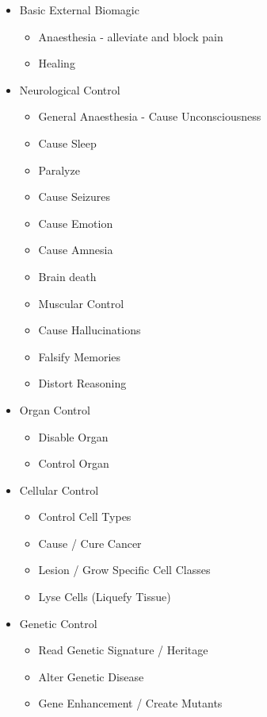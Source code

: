\documentclass[letterpaper,serif]{rpg-module}
\begin{document}
    \begin{itemize}
	\item Basic External Biomagic
	\begin{itemize}
    	\item Anaesthesia - alleviate and block pain
	    \item Healing
	\end{itemize}
	\item Neurological Control
	\begin{itemize}
    	\item General Anaesthesia - Cause Unconsciousness
	    \item Cause Sleep
	    \item Paralyze
	    \item Cause Seizures
	    \item Cause Emotion 
	    \item Cause Amnesia
	    \item Brain death
	    \item Muscular Control
	    \item Cause Hallucinations
	    \item Falsify Memories
	    \item Distort Reasoning
	\end{itemize}
	\item Organ Control
	\begin{itemize}
	    \item Disable Organ
	    \item Control Organ
	\end{itemize}
	\item Cellular Control 
	\begin{itemize}
	    \item Control Cell Types 
	    \item Cause / Cure Cancer
	    \item Lesion / Grow Specific Cell Classes 
	    \item Lyse Cells (Liquefy Tissue)
	\end{itemize}
    \item Genetic Control 
	\begin{itemize}
	    \item Read Genetic Signature / Heritage
	    \item Alter Genetic Disease
	    \item Gene Enhancement / Create Mutants
	\end{itemize}
	\end{itemize}
\end{document}
